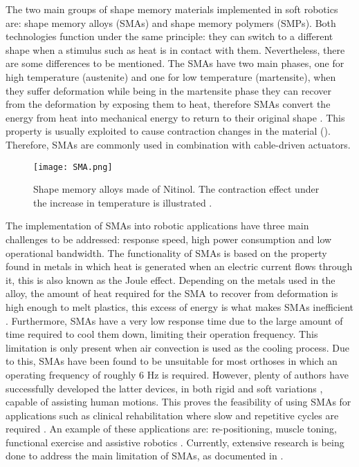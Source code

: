 The two main groups of shape memory materials implemented in soft robotics are: shape memory alloys (SMAs) and shape memory polymers (SMPs). Both technologies function under the same principle: they can switch to a different shape when a stimulus such as heat is in contact with them. Nevertheless, there are some differences to be mentioned. The SMAs have two main phases, one for high temperature (austenite) and one for low temperature (martensite), when they suffer deformation while being in the martensite phase they can recover from the deformation by exposing them to heat, therefore SMAs convert the energy from heat into mechanical energy to return to their original shape \cite{ImagesScientificInstrument2016}. This property is usually exploited to cause contraction changes in the material (). Therefore, SMAs are commonly used in combination with cable-driven actuators.
\begin{figure}[hbtp!]
    \centering
    \texttt{[image: SMA.png]}
    \caption[Shape memory alloys made of Nitinol. The contraction effect under the increase in temperature is illustrated.]{Shape memory alloys made of Nitinol. The contraction effect under the increase in temperature is illustrated \cite{ImagesScientificInstrument2016}. }
    \label{fig:SMA}
\end{figure}

The implementation of SMAs into robotic applications have three main challenges to be addressed: response speed, high power consumption and low operational bandwidth. The functionality of SMAs is based on the property found in metals in which heat is generated when an electric current flows through it, this is also known as the Joule effect. Depending on the metals used in the alloy, the amount of heat required for the SMA to recover from deformation is high enough to melt plastics, this excess of energy is what makes SMAs inefficient \cite{Bundhoo2009a,Bundhoo2009}. Furthermore, SMAs have a very low response time due to the large amount of time required to cool them down, limiting their operation frequency. This limitation is only present when air convection is used as the cooling process. Due to this, SMAs have been found to be unsuitable for most orthoses in which an operating frequency of roughly 6 Hz is required. However, plenty of authors have successfully developed the latter devices, in both rigid \cite{tarkesh2007} and soft variations \cite{Stirling2011}, capable of assisting human motions. This proves the feasibility of using SMAs for applications such as clinical rehabilitation where slow and repetitive cycles are required \cite{Pittaccio2009,Chenal2014}. An example of these applications are: re-positioning, muscle toning, functional exercise and assistive robotics \cite{pittaccio2012shape,Coral2012}. Currently, extensive research is being done to address the main limitation of SMAs, as documented in \cite{Coral2012}.

